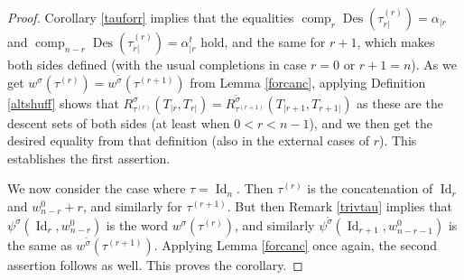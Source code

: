 \documentclass{article}
\theoremstyle{definition}
\begin{document}
\begin{proof}
Corollary \ref{tauforr} implies that the equalities $\operatorname{comp}_{r}\operatorname{Des}(\tau^{(r)}_{r|})=\alpha_{|r}$ and $\operatorname{comp}_{n-r}\operatorname{Des}(\tau^{(r)}_{r|})=\alpha_{|r}^{t}$ hold, and the same for $r+1$, which makes both sides defined (with the usual completions in case $r=0$ or $r+1=n$). As we get $w^{\sigma}(\tau^{(r)})=w^{\tilde{\sigma}}(\tau^{(r+1)})$ from Lemma \ref{forcanc}, applying Definition \ref{altshuff} shows that $R^{\sigma}_{\tau^{(r)}}(T_{|r},T_{r|})=R^{\tilde{\sigma}}_{\tau^{(r+1)}}(T_{|r+1},T_{r+1|})$ as these are the descent sets of both sides (at least when $0<r<n-1$), and we then get the desired equality from that definition (also in the external cases of $r$). This establishes the first assertion.

We now consider the case where $\tau=\operatorname{Id}_{n}$. Then $\tau^{(r)}$ is the concatenation of $\operatorname{Id}_{r}$ and $w^{0}_{n-r}+r$, and similarly for $\tau^{(r+1)}$. But then Remark \ref{trivtau} implies that $\psi^{\sigma}(\operatorname{Id}_{r},w^{0}_{n-r})$ is the word $w^{\sigma}(\tau^{(r)})$, and similarly $\psi^{\tilde{\sigma}}(\operatorname{Id}_{r+1},w^{0}_{n-r-1})$ is the same as $w^{\tilde{\sigma}}(\tau^{(r+1)})$. Applying Lemma \ref{forcanc} once again, the second assertion follows as well. This proves the corollary.
\end{proof}

\medskip
\end{document}
